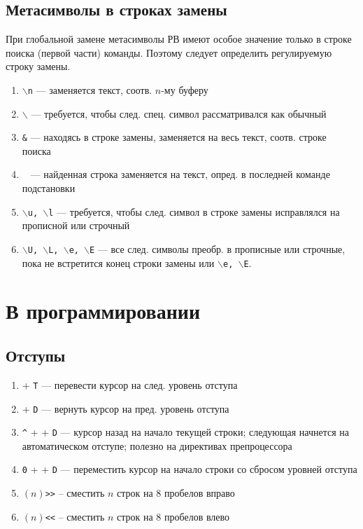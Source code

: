 \documentclass[a4paper,10pt, twocolumn]{article}
\newcommand*{\cod}[1]{\texttt{#1}}
\begin{document}
\subsection{Метасимволы в строках замены}
При глобальной замене метасимволы РВ имеют особое значение только в строке поиска (первой части) команды. Поэтому следует определить регулируемую строку замены.
\begin{enumerate}
    \item \cod{$\backslash$n} --- заменяется текст, соотв. $n$-му буферу
    \item \cod{$\backslash$} --- требуется, чтобы след. спец. символ рассматривался как обычный
    \item \cod{\&} --- находясь в строке замены, заменяется на весь текст, соотв. строке поиска
    \item \cod{~} --- найденная строка заменяется на текст, опред. в последней команде подстановки
    \item \cod{$\backslash$u, $\backslash$l} --- требуется, чтобы след. символ в строке замены исправлялся на прописной или строчный
    \item \cod{$\backslash$U, $\backslash$L, $\backslash$e, $\backslash$E} --- все след. символы преобр. в прописные или строчные, пока не встретится конец строки замены или \cod{$\backslash$e, $\backslash$E}.
\end{enumerate}

\section{В программировании}
\subsection{Отступы}
\begin{enumerate}
    \item \Ctrl + \cod{T} --- перевести курсор на след. уровень отступа
    \item \Ctrl + \cod{D} --- вернуть курсор на пред. уровень отступа
    \item \cod{\^} + \Ctrl + \cod{D} --- курсор назад на начало текущей строки; следующая начнется на автоматическом отступе; полезно на директивах препроцессора
    \item \cod{0} + \Ctrl + \cod{D} --- переместить курсор на начало строки со сбросом уровней отступа
    \item $(n)$\verb{>>{ -- сместить $n$ строк на 8 пробелов вправо
    \item $(n)$\verb{<<{ -- сместить $n$ строк на 8 пробелов влево
\end{enumerate}
\end{document}
